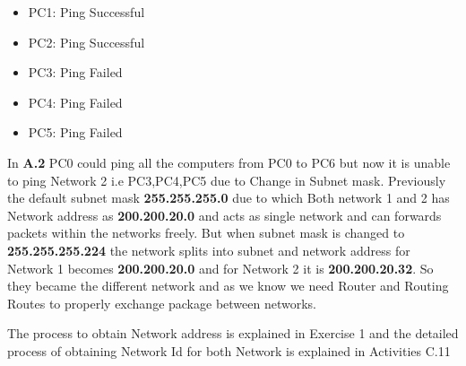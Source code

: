 \documentclass[a4paper,11pt]{article}
\begin{document}
\begin{enumerate}
            \begin{itemize}
                  \item PC1: Ping Successful
                  \item PC2: Ping Successful\\

                  \item PC3: Ping Failed
                  \item PC4: Ping Failed
                  \item PC5: Ping Failed
            \end{itemize}

            In \textbf{A.2} PC0 could ping all the computers from PC0 to PC6 but now it is unable to ping Network 2 i.e PC3,PC4,PC5  due to Change in Subnet mask. Previously the default subnet mask \textbf{255.255.255.0} due to which Both network 1 and 2 has Network address as \textbf{200.200.20.0} and acts as single network and can forwards packets within the networks freely. But when subnet mask is changed to \textbf{255.255.255.224} the network splits into subnet and network address for Network 1 becomes \textbf{200.200.20.0} and for Network 2 it is \textbf{200.200.20.32}.  So they became the different network and as we know we need Router and Routing Routes to properly exchange package between networks.

            The process to obtain Network address is explained in Exercise 1 and the detailed process of obtaining Network Id for both Network is explained in Activities C.11



\end{enumerate}
\end{document}
